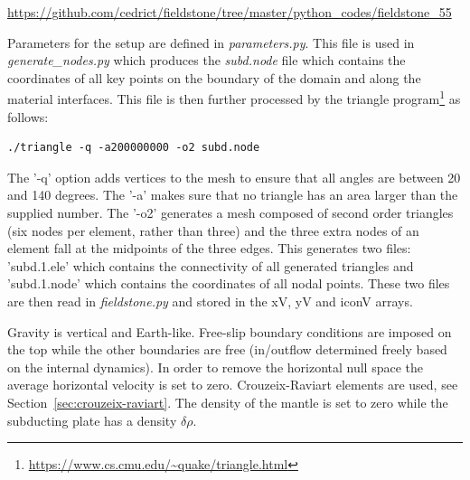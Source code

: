 \url{https://github.com/cedrict/fieldstone/tree/master/python_codes/fieldstone_55}

\vspace{1cm}

Parameters for the setup are defined in {\sl parameters.py}.
This file is used in {\sl generate\_nodes.py} which produces the
{\sl subd.node} file which contains the coordinates of all key points 
on the boundary of the domain and along the material interfaces.
This file is then further processed by the triangle 
program\footnote{\url{https://www.cs.cmu.edu/~quake/triangle.html}}
as follows:
\begin{verbatim}
./triangle -q -a200000000 -o2 subd.node
\end{verbatim}
The '-q' option adds vertices to the mesh to
ensure that all angles are between 20 and 140 degrees. 
The '-a' makes sure that no triangle has an area larger than 
the supplied number. The '-o2' generates a mesh composed 
of second order triangles (six nodes per element, rather than three) and the
three extra nodes of an element fall at the midpoints of the three edges.
This generates two files: 'subd.1.ele' which contains the connectivity 
of all generated triangles and 'subd.1.node' which contains the coordinates
of all nodal points. 
These two files are then read in {\sl fieldstone.py} and stored in the xV, yV and iconV arrays.

Gravity is vertical and Earth-like. Free-slip boundary conditions are imposed on the top while 
the other boundaries are free (in/outflow determined freely based on the internal dynamics). 
In order to remove the horizontal null space the average horizontal velocity is set to zero. 
Crouzeix-Raviart elements are used, see Section~\ref{sec:crouzeix-raviart}.
The density of the mantle is set to zero while the subducting plate has a density $\delta\rho$. 

